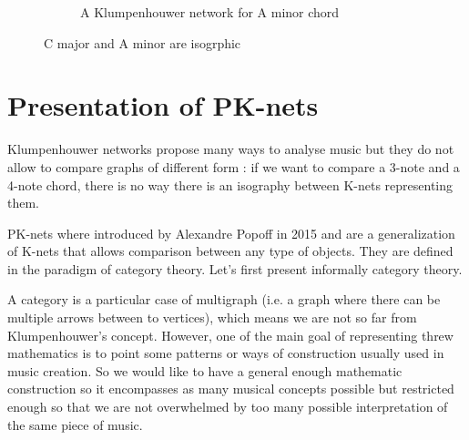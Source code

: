 \begin{exmp}
\begin{figure}[h]
\begin{subfigure}{.29\textwidth}
            \caption{A Klumpenhouwer network for A minor chord}
            \label{fig:KAminor}
        \end{subfigure}
        \caption{C major and A minor are isogrphic}
        \label{fig:Kisography}
    \end{figure}
\end{exmp}




\section{Presentation of PK-nets}
Klumpenhouwer networks propose many ways to analyse music but they do not allow to compare graphs of different form : if we want to compare a 3-note and a 4-note chord, there is no way there is an isography between K-nets representing them.

PK-nets\cite{PAAE2016} where introduced by Alexandre Popoff in 2015\cite{popoff2015categorical} and are a generalization of K-nets that allows comparison between any type of objects. They are defined in the paradigm of category theory. Let's first present informally category theory.

A category is a particular case of multigraph (i.e. a graph where there can be multiple arrows between to vertices), which means we are not so far from Klumpenhouwer's concept. However, one of the main goal of representing threw mathematics is to point some patterns or ways of construction usually used in music creation. So we would like to have a general enough mathematic construction so it encompasses as many musical concepts possible but restricted enough so that we are not overwhelmed by too many possible interpretation of the same piece of music.

